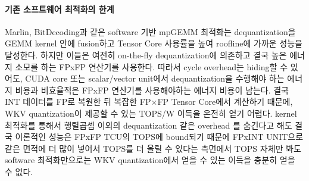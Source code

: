 \documentclass[11pt]{article}
\newcommand{\wkv}{WKV}
\begin{document}
\paragraph{기존 소프트웨어 최적화의 한계}
Marlin, BitDecoding과 같은 software 기반 mpGEMM 최적화는 dequantization을 GEMM kernel 안에 fusion하고 Tensor Core 사용률을 높여 roofline에 가까운 성능을 달성한다.
하지만 이들은 여전히 on-the-fly dequantization에 의존하고 결국 높은 에너지 소모를 하는 FPxFP 연산기를 사용한다.
따라서 cycle overhead는 hiding할 수 있어도, CUDA core 또는 scalar/vector unit에서 dequantization을 수행해야 하는 에너지 비용과 비효율적은 FPxFP 연산기를 사용해야하는 에너지 비용이 남는다.
결국 INT 데이터를 FP로 복원한 뒤 복잡한 FP$\times$FP Tensor Core에서 계산하기 때문에, \wkv{} quantization이 제공할 수 있는 TOPS/W 이득을 온전히 얻기 어렵다.
kernel 최적화를 통해서 행렬곱셈 이외의 dequantization 같은 overhead 를 숨긴다고 해도 결국 이론적인 성능은 FPxFP TCU의 TOPS에 bound되기 때문에 FPxINT UNIT으로 같은 면적에 더 많이 넣어서 TOPS를 더 올릴 수 있다는 측면에서 TOPS 자체만 봐도 software 최적화만으로는 \wkv{} quantization에서 얻을 수 있는 이득을 충분히 얻을 수 없다.
\end{document}
